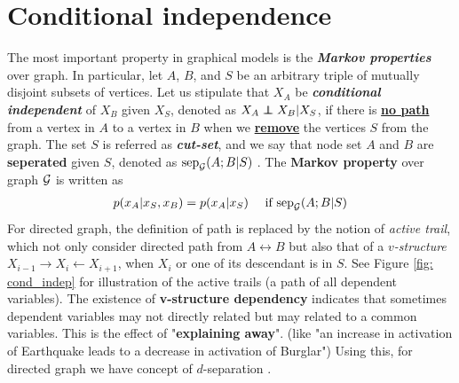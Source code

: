 \documentclass[11pt]{article}
\begin{document}
\section{Conditional independence}
The most important property in graphical models is the \textbf{\emph{Markov properties}} over graph. In particular, let $A$, $B$, and $S$ be an arbitrary triple of mutually disjoint subsets of vertices. Let us stipulate that $X_A$ be \textbf{\emph{conditional independent}} of $X_B$ given $X_S$,  denoted as $X_{A} \indep X_{B} | X_{S}$,  if there is \underline{\textbf{no path}} from a vertex in $A$ to a vertex in $B$ when we  \underline{\textbf{remove}} the vertices $S$ from the graph. The set $S$ is referred as \textbf{\emph{cut-set}}, and we say that node set $A$ and $B$ are \textbf{seperated} given $S$, denoted as $\text{sep}_{{\mathcal G}}(A; B | S)$  \citep{koller2009probabilistic}. The \textbf{Markov property} over graph ${\mathcal G}$ is written as 
\begin{align*}
p(x_{A} | x_{S}, x_{B}) = p(x_{A} | x_{S})\quad \text{ if }\text{sep}_{{\mathcal G}}(A; B | S)
\end{align*} For directed graph, the definition of path is replaced by the notion of \emph{active trail}, which not only consider directed path from $A \leftrightarrow B$ but also that of a \emph{$v$-structure} $X_{i-1} \rightarrow X_{i} \leftarrow X_{i+1}$, when $X_i$ or one of its descendant is in $S$. See Figure \ref{fig: cond_indep} for illustration of the active trails (a path of all dependent variables). The existence of \textbf{v-structure dependency} indicates that sometimes dependent variables may not directly related but may related to a common variables. This is the effect of "\textbf{explaining away}". (like "an increase in activation of Earthquake leads to a decrease in activation of Burglar") Using this, for directed graph we have concept of $d$-separation \citep{koller2009probabilistic}.
\end{document}

